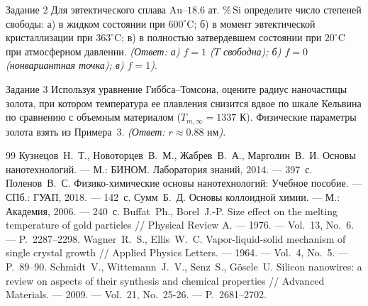 \documentclass[12pt,a4paper]{article}
\begin{document}
\begin{questbox}{Задание 2}
Для эвтектического сплава $\mathrm{Au\text{--}18.6\text{ ат. }\%\,Si}$ определите число степеней свободы: а) в жидком состоянии при $600^\circ\mathrm{C}$; б) в момент эвтектической кристаллизации при $363^\circ\mathrm{C}$; в) в полностью затвердевшем состоянии при $20^\circ\mathrm{C}$ при атмосферном давлении.
\textit{(Ответ: а) $f = 1$ ($T$ свободна); б) $f = 0$ (нонвариантная точка); в) $f = 1$)}.
\end{questbox}

\begin{questbox}{Задание 3}
Используя уравнение Гиббса--Томсона, оцените радиус наночастицы золота, при котором температура ее плавления снизится вдвое по шкале Кельвина по сравнению с объемным материалом ($T_{m,\infty} = 1337\text{ К}$). Физические параметры золота взять из Примера~3.
\textit{(Ответ: $r \approx 0.88\text{ нм}$)}.
\end{questbox}

\begin{thebibliography}{99}
 Кузнецов~Н.~Т., Новоторцев~В.~М., Жабрев~В.~А., Марголин~В.~И. Основы нанотехнологий. --- М.: БИНОМ. Лаборатория знаний, 2014. --- 397~с.
 Поленов~В.~С. Физико-химические основы нанотехнологий: Учебное пособие. --- СПб.: ГУАП, 2018. --- 142~с.
 Сумм~Б.~Д. Основы коллоидной химии. --- М.: Академия, 2006. --- 240~с.
 Buffat~Ph., Borel~J.-P. Size effect on the melting temperature of gold particles // Physical Review A. --- 1976. --- Vol.~13, No.~6. --- P.~2287--2298.
 Wagner~R.~S., Ellis~W.~C. Vapor-liquid-solid mechanism of single crystal growth // Applied Physics Letters. --- 1964. --- Vol.~4, No.~5. --- P.~89--90.
 Schmidt~V., Wittemann~J.~V., Senz~S., G{\"o}sele~U. Silicon nanowires: a review on aspects of their synthesis and chemical properties // Advanced Materials. --- 2009. --- Vol.~21, No.~25-26. --- P.~2681--2702.
\end{thebibliography}
\end{document}

